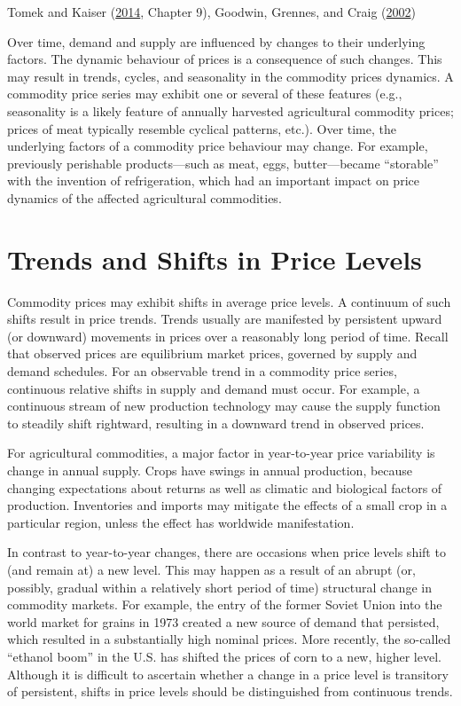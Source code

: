 \documentclass[
]{book}
\begin{document}
Tomek and Kaiser (\protect\hyperlink{ref-tomek2014}{2014}, Chapter 9), Goodwin, Grennes, and Craig (\protect\hyperlink{ref-goodwin2002}{2002})

Over time, demand and supply are influenced by changes to their underlying factors. The dynamic behaviour of prices is a consequence of such changes. This may result in trends, cycles, and seasonality in the commodity prices dynamics. A commodity price series may exhibit one or several of these features (e.g., seasonality is a likely feature of annually harvested agricultural commodity prices; prices of meat typically resemble cyclical patterns, etc.). Over time, the underlying factors of a commodity price behaviour may change. For example, previously perishable products---such as meat, eggs, butter---became ``storable'' with the invention of refrigeration, which had an important impact on price dynamics of the affected agricultural commodities.

\hypertarget{trends-and-shifts-in-price-levels}{%
\section{Trends and Shifts in Price Levels}\label{trends-and-shifts-in-price-levels}}

Commodity prices may exhibit shifts in average price levels. A continuum of such shifts result in price trends. Trends usually are manifested by persistent upward (or downward) movements in prices over a reasonably long period of time. Recall that observed prices are equilibrium market prices, governed by supply and demand schedules. For an observable trend in a commodity price series, continuous relative shifts in supply and demand must occur. For example, a continuous stream of new production technology may cause the supply function to steadily shift rightward, resulting in a downward trend in observed prices.

For agricultural commodities, a major factor in year-to-year price variability is change in annual supply. Crops have swings in annual production, because changing expectations about returns as well as climatic and biological factors of production. Inventories and imports may mitigate the effects of a small crop in a particular region, unless the effect has worldwide manifestation.

In contrast to year-to-year changes, there are occasions when price levels shift to (and remain at) a new level. This may happen as a result of an abrupt (or, possibly, gradual within a relatively short period of time) structural change in commodity markets. For example, the entry of the former Soviet Union into the world market for grains in 1973 created a new source of demand that persisted, which resulted in a substantially high nominal prices. More recently, the so-called ``ethanol boom'' in the U.S. has shifted the prices of corn to a new, higher level. Although it is difficult to ascertain whether a change in a price level is transitory of persistent, shifts in price levels should be distinguished from continuous trends.
\end{document}

